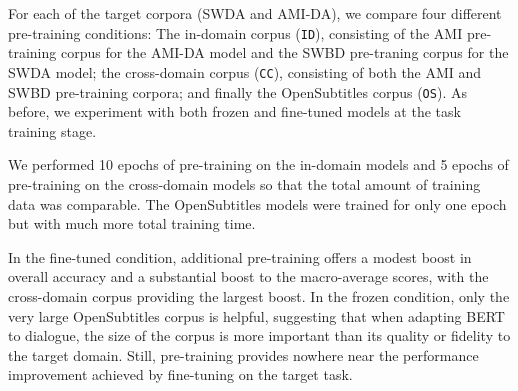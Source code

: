 \documentclass[11pt,a4paper]{article}
\begin{document}
For each of the target corpora (SWDA and AMI-DA), we compare four different pre-training conditions: 
The in-domain corpus (\texttt{ID}), consisting of the AMI pre-training corpus for the AMI-DA model and the SWBD pre-traning corpus for the SWDA model; 
the cross-domain corpus (\texttt{CC}), consisting of both the AMI and SWBD pre-training corpora; 
and finally the OpenSubtitles corpus (\texttt{OS}).
As before, we experiment with both frozen and fine-tuned models at the task training stage.

We performed 10 epochs of pre-training on the in-domain models and 5 epochs of pre-training on the cross-domain models so that the total amount of training data was comparable. The OpenSubtitles models were trained for only one epoch but with much more total training time. 

In the fine-tuned condition, additional pre-training offers a modest boost in overall accuracy and a substantial boost to the macro-average scores, with the cross-domain corpus providing the largest boost.
In the frozen condition, only the very large OpenSubtitles corpus is helpful, suggesting that when adapting BERT to dialogue, the size of the corpus is more important than its quality or fidelity to the target domain.
Still, pre-training provides nowhere near the performance improvement achieved by fine-tuning on the target task.
\end{document}
